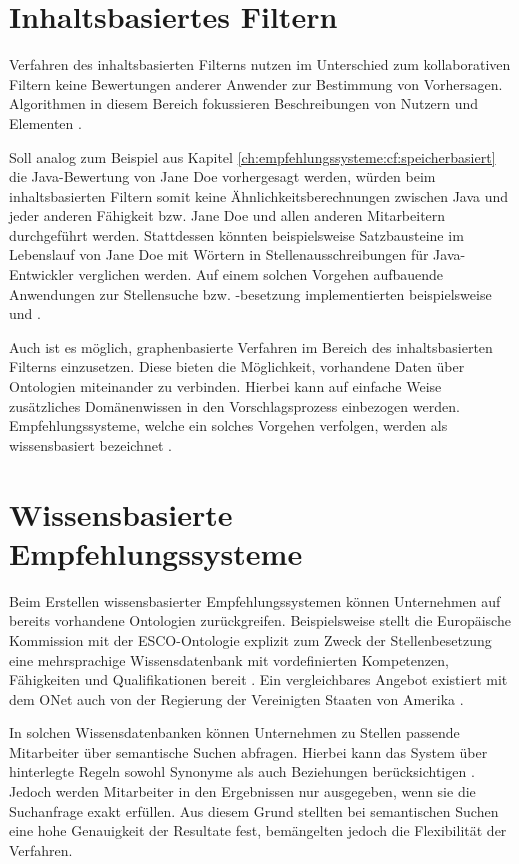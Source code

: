 \section{Inhaltsbasiertes Filtern}
\label{ch:empfehlungssysteme:inhaltsbasiertesFiltern}
Verfahren des inhaltsbasierten Filterns nutzen im Unterschied zum kollaborativen Filtern keine Bewertungen anderer Anwender zur Bestimmung von Vorhersagen. Algorithmen in diesem Bereich fokussieren Beschreibungen von Nutzern und Elementen \cite[S. 139f.]{recommenderSystems:2016}.

Soll analog zum Beispiel aus Kapitel \ref{ch:empfehlungssysteme:cf:speicherbasiert} die Java-Bewertung von Jane Doe vorhergesagt werden, würden beim inhaltsbasierten Filtern somit keine Ähnlichkeitsberechnungen zwischen Java und jeder anderen Fähigkeit bzw. Jane Doe und allen anderen Mitarbeitern durchgeführt werden. Stattdessen könnten beispielsweise Satzbausteine im Lebenslauf von Jane Doe mit Wörtern in Stellenausschreibungen für Java-Entwickler verglichen werden. Auf einem solchen Vorgehen aufbauende Anwendungen zur Stellensuche bzw. -besetzung implementierten beispielsweise \textcite[S. 4ff.]{guo:2016} und \textcite[S. 3ff.]{prospect:2010}.

Auch ist es möglich, graphenbasierte Verfahren im Bereich des inhaltsbasierten Filterns  einzusetzen. Diese bieten die Möglichkeit, vorhandene Daten über Ontologien miteinander zu verbinden. Hierbei kann auf einfache Weise zusätzliches Domänenwissen in den Vorschlagsprozess einbezogen werden. Empfehlungssysteme, welche ein solches Vorgehen verfolgen, werden als wissensbasiert bezeichnet \cite[S. 168f.]{recommenderSystems:2016}.

\section{Wissensbasierte Empfehlungssysteme}
\label{ch:empfehlungssysteme:wissensbasierteAnsaetze}
Beim Erstellen wissensbasierter Empfehlungssystemen können Unternehmen auf bereits vorhandene Ontologien zurückgreifen. Beispielsweise stellt die Europäische Kommission mit der \ac{ESCO}-Ontologie explizit zum Zweck der Stellenbesetzung eine mehrsprachige Wissensdatenbank mit vordefinierten Kompetenzen, Fähigkeiten und Qualifikationen bereit \cite[S. 1ff.]{leVrang:2014}. Ein vergleichbares Angebot existiert mit dem \ac{ONet} auch von der Regierung der Vereinigten Staaten von Amerika \cite[S. 2]{aCombinedRepresentation:2018}.

In solchen Wissensdatenbanken können Unternehmen zu Stellen passende Mitarbeiter über semantische Suchen abfragen. Hierbei kann das System über hinterlegte Regeln sowohl Synonyme als auch Beziehungen berücksichtigen \cite[S. 2f.]{singto:2013}. Jedoch werden Mitarbeiter in den Ergebnissen nur ausgegeben, wenn sie die Suchanfrage exakt erfüllen. Aus diesem Grund stellten \textcite[S. 3]{bianchini:2008} bei semantischen Suchen eine hohe Genauigkeit der Resultate fest, bemängelten jedoch die Flexibilität der Verfahren.

